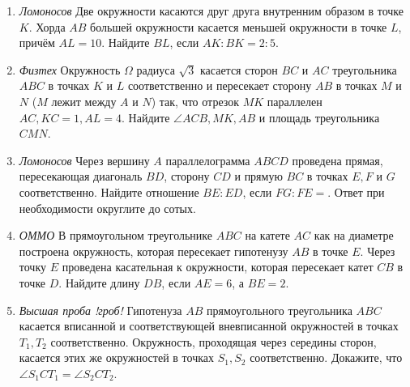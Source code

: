 \begin{enumerate}
    \item \textit{Ломоносов} Две окружности касаются друг друга внутренним образом в точке $K$. Хорда $AB$ большей окружности касается меньшей окружности в точке $L$, причём $AL=10$. Найдите $BL$, если $AK:BK=2:5$.
    \item \textit{Физтех} Окружность $\Omega$ радиуса $\sqrt{3}$ касается сторон $BC$ и $AC$ треугольника $ABC$ в точках $K$ и $L$ соответственно и пересекает сторону $AB$ в точках $M$ и $N$ ($M$ лежит между $A$ и $N$) так, что отрезок $MK$ параллелен $AC, KC=1,AL=4$. Найдите $\angle ACB, MK, AB$ и площадь треугольника $CMN$.
    \item \textit{Ломоносов} Через вершину $A$ параллелограмма $ABCD$ проведена прямая, пересекающая диагональ $BD$, сторону $CD$ и прямую $BC$ в точках $E, F$ и $G$ соответственно. Найдите отношение $BE:ED$, если $FG:FE=$. Ответ при необходимости округлите до сотых.
    \item \textit{ОММО} В прямоугольном треугольнике $ABC$ на катете $AC$ как на диаметре построена окружность, которая пересекает гипотенузу $AB$ в точке $E$. Через точку $E$ проведена касательная к окружности, которая пересекает катет $CB$ в точке $D$. Найдите длину $DB$, если $AE=6$, а $BE=2$.
    \item \textit{Высшая проба !гроб!} Гипотенуза $AB$ прямоугольного треугольника $ABC$ касается вписанной и соответствующей вневписанной окружностей в точках $T_1, T_2$ соответственно. Окружность, проходящая через середины сторон, касается этих же окружностей в точках $S_1, S_2$ соответственно. Докажите, что $\angle S_1CT_1=\angle S_2CT_2$.
\end{enumerate}
